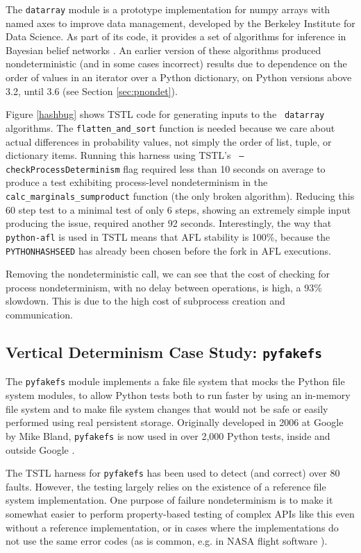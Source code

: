 The {\tt datarray} module \cite{datarray} is a prototype
implementation for numpy arrays with named axes to improve data
management, developed by the Berkeley Institute for Data Science.  As part of its code, it provides a set of algorithms for
inference in
Bayesian belief networks \cite{russell2016artificial}.  An earlier
version of these algorithms produced nondeterministic (and in some
cases incorrect) results due to dependence on the order of values in
an iterator over a Python dictionary, on Python versions above 3.2, until 3.6 (see Section \ref{sec:pnondet}).

Figure \ref{hashbug} shows TSTL code for generating inputs to the {\tt
  datarray} algorithms.  The {\tt flatten\_and\_sort} function is needed because we care about actual differences in probability values, not simply the order of list, tuple, or dictionary items.  Running this harness using TSTL's {\tt
  --checkProcessDeterminism} flag required less than 10 seconds on
average to produce a test exhibiting process-level nondeterminism in
the {\tt calc\_marginals\_sumproduct} function (the only broken
algorithm).  Reducing this 60 step test to a minimal test of only 6 steps,
showing an extremely simple input producing the issue, 
required another 92 seconds.  Interestingly, the way that {\tt
  python-afl} is used in TSTL means that AFL stability is 100\%,
because the {\tt PYTHONHASHSEED} has already been chosen before the
fork in AFL executions.

Removing the nondeterministic call, we can see that the cost of
checking for process nondeterminism, with no delay between operations,
is high, a 93\% slowdown.  This is due to the high cost of subprocess
creation and communication.


\subsection {Vertical Determinism Case Study: {\tt pyfakefs}}

The {\tt pyfakefs} \cite{pyfakefs} module implements a fake file
system that mocks the Python file system modules, to allow Python
tests both to run faster by using an in-memory file system and to make
file system changes that would not be safe or easily performed using
real persistent storage.  Originally developed in 2006 at Google by
Mike Bland, {\tt pyfakefs} is now used in over 2,000 Python tests,
inside and outside Google \cite{pyfakefs}.

The TSTL harness for {\tt pyfakefs} has been used to detect (and
correct) over 80 faults.  However, the testing largely relies on
the existence of a reference file system implementation.  One purpose
of failure nondeterminism is to make it somewhat easier to perform
property-based testing of
complex APIs like this even without a reference implementation, or in cases
where the implementations do not use the same error
codes (as is common, e.g. in NASA flight software
\cite{ICSEDiff,CFV08}).


